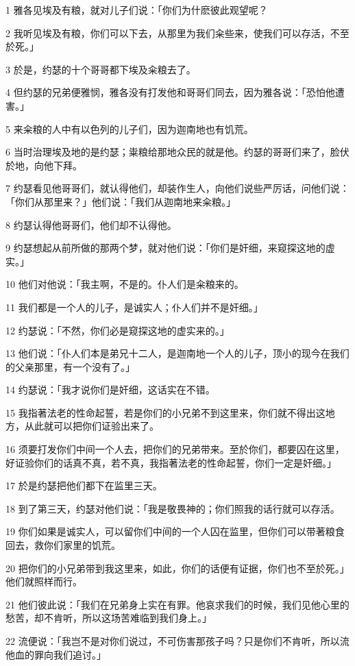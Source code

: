 \par 1 雅各见埃及有粮，就对儿子们说：「你们为什麽彼此观望呢？
\par 2 我听见埃及有粮，你们可以下去，从那里为我们籴些来，使我们可以存活，不至於死。」
\par 3 於是，约瑟的十个哥哥都下埃及籴粮去了。
\par 4 但约瑟的兄弟便雅悯，雅各没有打发他和哥哥们同去，因为雅各说：「恐怕他遭害。」
\par 5 来籴粮的人中有以色列的儿子们，因为迦南地也有饥荒。
\par 6 当时治理埃及地的是约瑟；粜粮给那地众民的就是他。约瑟的哥哥们来了，脸伏於地，向他下拜。
\par 7 约瑟看见他哥哥们，就认得他们，却装作生人，向他们说些严厉话，问他们说：「你们从那里来？」他们说：「我们从迦南地来籴粮。」
\par 8 约瑟认得他哥哥们，他们却不认得他。
\par 9 约瑟想起从前所做的那两个梦，就对他们说：「你们是奸细，来窥探这地的虚实。」
\par 10 他们对他说：「我主啊，不是的。仆人们是籴粮来的。
\par 11 我们都是一个人的儿子，是诚实人；仆人们并不是奸细。」
\par 12 约瑟说：「不然，你们必是窥探这地的虚实来的。」
\par 13 他们说：「仆人们本是弟兄十二人，是迦南地一个人的儿子，顶小的现今在我们的父亲那里，有一个没有了。」
\par 14 约瑟说：「我才说你们是奸细，这话实在不错。
\par 15 我指著法老的性命起誓，若是你们的小兄弟不到这里来，你们就不得出这地方，从此就可以把你们证验出来了。
\par 16 须要打发你们中间一个人去，把你们的兄弟带来。至於你们，都要囚在这里，好证验你们的话真不真，若不真，我指著法老的性命起誓，你们一定是奸细。」
\par 17 於是约瑟把他们都下在监里三天。
\par 18 到了第三天，约瑟对他们说：「我是敬畏神的；你们照我的话行就可以存活。
\par 19 你们如果是诚实人，可以留你们中间的一个人囚在监里，但你们可以带著粮食回去，救你们家里的饥荒。
\par 20 把你们的小兄弟带到我这里来，如此，你们的话便有证据，你们也不至於死。」他们就照样而行。
\par 21 他们彼此说：「我们在兄弟身上实在有罪。他哀求我们的时候，我们见他心里的愁苦，却不肯听，所以这场苦难临到我们身上。」
\par 22 流便说：「我岂不是对你们说过，不可伤害那孩子吗？只是你们不肯听，所以流他血的罪向我们追讨。」
